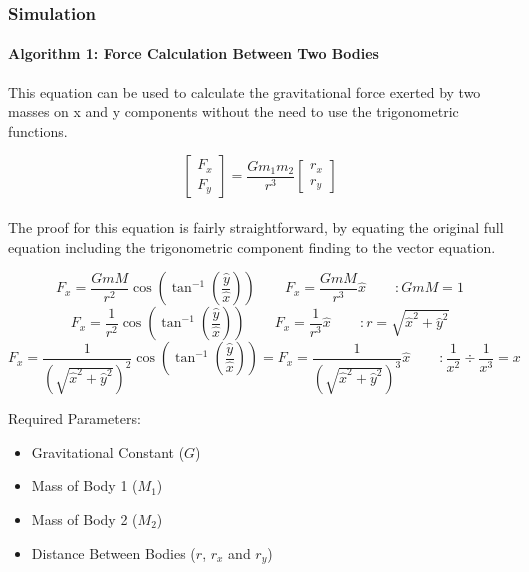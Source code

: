 \subsubsection{Simulation}
\paragraph{Algorithm 1: Force Calculation Between Two Bodies}
This equation can be used to calculate the gravitational force exerted by two masses on x and y components without the need to use the trigonometric functions.

$$\begin{bmatrix} F_x \\ F_y \end{bmatrix} = \frac{Gm_1m_2}{r^3} \begin{bmatrix} r_x \\ r_y \end{bmatrix}$$

\paragraph{}
The proof for this equation is fairly straightforward, by equating the original full equation including the trigonometric component finding to the vector equation.

$$F_x=\frac{GmM}{r^2}\cos\left(\tan^{-1}\left(\frac{\hat{y}}{\hat{x}}\right)\right) \hspace{25pt} F_x=\frac{GmM}{r^3}\hat{x} \hspace{25pt} : GmM = 1$$ 
\vspace{10pt}
$$F_x=\frac{1}{r^2}\cos\left(\tan^{-1}\left(\frac{\hat{y}}{\hat{x}}\right)\right) \hspace{25pt} F_x=\frac{1}{r^3}\hat{x} \hspace{25pt} : r=\sqrt{\hat{x}^2+\hat{y}^2}$$ 
\vspace{10pt}
$$F_x=\frac{1}{(\sqrt{\hat{x}^2+\hat{y}^2})^2}\cos\left(\tan^{-1}\left(\frac{\hat{y}}{\hat{x}}\right)\right) = F_x=\frac{1}{(\sqrt{\hat{x}^2+\hat{y}^2})^3}\hat{x} \hspace{25pt} : \frac{1}{x^2} \div \frac{1}{x^3}  = x$$

Required Parameters:
\begin{itemize}
\item Gravitational Constant ($G$)
\item Mass of Body 1 ($M_1$)
\item Mass of Body 2 ($M_2$)
\item Distance Between Bodies ($r$, $r_x$ and $r_y$)
\end{itemize}

